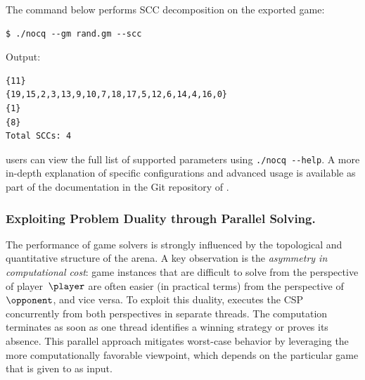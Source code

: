 \documentclass[runningheads]{llncs}
\begin{document}
\noindent The command below performs SCC decomposition on the exported game:
\begin{lstlisting}
$ ./nocq --gm rand.gm --scc
\end{lstlisting}

\noindent Output:
\begin{lstlisting}
{11}
{19,15,2,3,13,9,10,7,18,17,5,12,6,14,4,16,0}
{1}
{8}
Total SCCs: 4
\end{lstlisting}

\noindent \nocq users can view the full list of supported parameters using \texttt{./nocq -\--help}. A more in-depth explanation of specific configurations and advanced usage is available as part of the documentation in the Git repository of \nocq. 

\subsubsection{Exploiting Problem Duality through Parallel Solving.}

The performance of game solvers is strongly influenced by the topological and quantitative structure of the arena. A key observation is the \emph{asymmetry in computational cost}: game instances that are difficult to solve from the perspective of player~$\player$ are often easier (in practical terms) from the perspective of $\opponent$, and vice versa.
%
To exploit this duality, \nocq executes the CSP concurrently from both perspectives in separate threads. The computation terminates as soon as one thread identifies a winning strategy or proves its absence. This parallel approach mitigates worst-case behavior by leveraging the more computationally favorable viewpoint, which depends on the particular game that is given to \nocq as input. 



\end{document}
